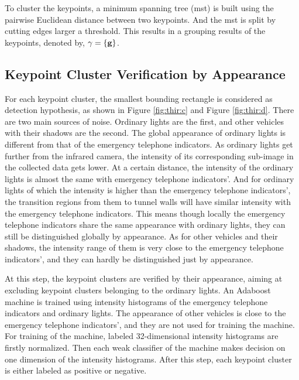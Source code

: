 To cluster the keypoints, a minimum spanning tree (mst) is built using the pairwise Euclidean distance between two keypoints. And the mst is split by cutting edges larger a threshold. This results in a grouping results of the keypoints, denoted by, $\gamma=\{\bf{g}\}$.


\subsection{Keypoint Cluster Verification by Appearance}

For each keypoint cluster, the smallest bounding rectangle is considered as detection hypothesis, as shown in Figure \ref{fig:thir:c} and Figure \ref{fig:thir:d}. There are two main sources of noise. Ordinary lights are the first, and other vehicles with their shadows are the second. The global appearance of ordinary lights is different from that of the emergency telephone indicators. As ordinary lights get further from the infrared camera, the intensity of its corresponding sub-image in the collected data gets lower. At a certain distance, the intensity of the ordinary  lights is almost the same with emergency telephone indicators'. And for ordinary lights of which the intensity is higher than the emergency telephone indicators', the transition regions from them to tunnel walls will have similar intensity with the emergency telephone indicators.
This means though locally the emergency telephone indicators share the same appearance with ordinary lights, they can still be distinguished globally by appearance. As for other vehicles and their shadows, the intensity range of them is very close to the emergency telephone indicators', and they can hardly be distinguished just by appearance.



At this step, the keypoint clusters are verified by their appearance, aiming at excluding keypoint clusters belonging to the ordinary lights. An Adaboost machine is trained using intensity histograms of the emergency telephone indicators and ordinary lights. The appearance of other vehicles is close to the emergency telephone indicators', and they are not used for training the machine. For training of the machine, labeled 32-dimensional intensity histograms are firstly normalized. Then each weak classifier of the machine makes decision on one dimension of the intensity histograms. After this step, each keypoint cluster is either labeled as positive or negative.


